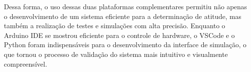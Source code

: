 \documentclass[
	12pt,				%
	openright,			%
	oneside,			%
	a4paper,			%
	english,			%
	brazil				%
	]{abntex2}
\begin{document}
Dessa forma, o uso dessas duas plataformas complementares permitiu não apenas o desenvolvimento de um sistema eficiente para a determinação de atitude, mas também a realização de testes e simulações com alta precisão. Enquanto o Arduino IDE se mostrou eficiente para o controle de hardware, o VSCode e o Python foram indispensáveis para o desenvolvimento da interface de simulação, o que tornou o processo de validação do sistema mais intuitivo e visualmente compreensível.









\postextual

\printbibliography[title=Referências]


%
%

\end{document}
